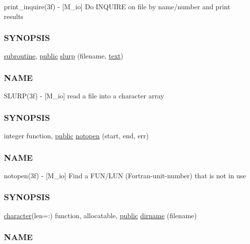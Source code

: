 \begin{DoxyCompactItemize}
\begin{DoxyCompactList}
print\+\_\+inquire(3f) -\/ \mbox{[}M\+\_\+io\mbox{]} Do I\+N\+Q\+U\+I\+RE on file by name/number and print results \subsubsection*{S\+Y\+N\+O\+P\+S\+IS}\end{DoxyCompactList}\item 
\hyperlink{M__stopwatch_83_8txt_acfbcff50169d691ff02d4a123ed70482}{subroutine}, \hyperlink{M__stopwatch_83_8txt_a2f74811300c361e53b430611a7d1769f}{public} \hyperlink{namespacem__io_ad25822cde8058cd6861e2d9a5d729ccc}{slurp} (filename, \hyperlink{README_8txt_afda9e6898bd09238e9e9be4c62ce246b}{text})
\begin{DoxyCompactList}\small\item\em \subsubsection*{N\+A\+ME}

S\+L\+U\+R\+P(3f) -\/ \mbox{[}M\+\_\+io\mbox{]} read a file into a character array \subsubsection*{S\+Y\+N\+O\+P\+S\+IS}\end{DoxyCompactList}\item 
integer function, \hyperlink{M__stopwatch_83_8txt_a2f74811300c361e53b430611a7d1769f}{public} \hyperlink{namespacem__io_a673f7f7e137424eed9c6a736901a5cbc}{notopen} (start, end, err)
\begin{DoxyCompactList}\small\item\em \subsubsection*{N\+A\+ME}

notopen(3f) -\/ \mbox{[}M\+\_\+io\mbox{]} Find a F\+U\+N/\+L\+UN (Fortran-\/unit-\/number) that is not in use \subsubsection*{S\+Y\+N\+O\+P\+S\+IS}\end{DoxyCompactList}\item 
\hyperlink{option__stopwatch_83_8txt_abd4b21fbbd175834027b5224bfe97e66}{character}(len=\+:) function, allocatable, \hyperlink{M__stopwatch_83_8txt_a2f74811300c361e53b430611a7d1769f}{public} \hyperlink{namespacem__io_a85eb6aa886ca8e591fdc837919f81708}{dirname} (filename)
\begin{DoxyCompactList}\small\item\em \subsubsection*{N\+A\+ME}


\end{DoxyCompactList}
\end{DoxyCompactItemize}
